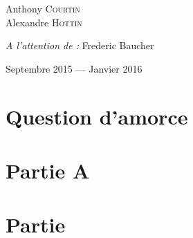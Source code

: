 \documentclass[12pt, openany]{report}
\begin{document}
\begin{titlepage}
\begin{sffamily}
\begin{center}
    \begin{minipage}{0.4\textwidth}
      \begin{flushleft} \large
        Anthony \textsc{Courtin}\\
        Alexandre \textsc{Hottin}\\
      \end{flushleft}
    \end{minipage}
    \begin{minipage}{0.4\textwidth}
      \begin{flushright} \large
        \emph{A l'attention de :} Frederic Baucher \\
      \end{flushright}
    \end{minipage}

    \vfill

    {\large Septembre 2015 — Janvier 2016}

  \end{center}
  \end{sffamily}
\end{titlepage}

\tableofcontents{}
\newpage

\chapter{Question d'amorce}


\chapter{Partie A}


\chapter{Partie }


% 

% 

% 

% 

\listoffigures
\end{document}
